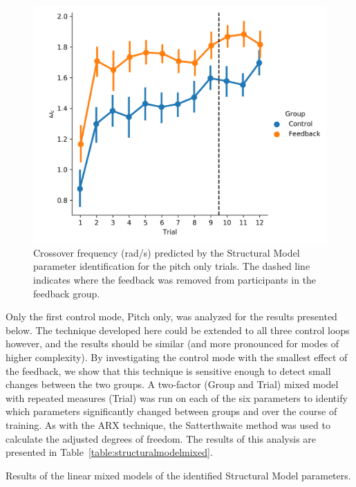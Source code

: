 \begin{figure}[tb]
    \centering
    \includegraphics[width=0.8\linewidth]{figures/Modeling/wc_group.png}
    \caption[Crossover frequency (Structural Model)]{Crossover frequency (rad/s) predicted by the Structural Model parameter identification for the pitch only trials.
    The dashed line indicates where the feedback was removed from participants in the feedback group.}
    \label{fig:sm_crossover}
\end{figure}

Only the first control mode, Pitch only, was analyzed for the results presented below.
The technique developed here could be extended to all three control loops however, and the results should be similar (and more pronounced for modes of higher complexity).
By investigating the control mode with the smallest effect of the feedback, we show that this technique is sensitive enough to detect small changes between the two groups.
A two-factor (Group and Trial) mixed model with repeated measures (Trial) was run on each of the six parameters to identify which parameters significantly changed between groups and over the course of training.
As with the ARX technique, the Satterthwaite method was used to calculate the adjusted degrees of freedom.
The results of this analysis are presented in Table~\ref{table:structuralmodelmixed}.

\begin{table}[tb]
    \centering
    \caption[Results of the linear mixed models of the identified Structural Model parameters]{Results of the linear mixed models of the identified Structural Model parameters.}
    \label{table:structuralmodelmixed}
\end{table}

